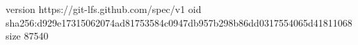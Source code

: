 version https://git-lfs.github.com/spec/v1
oid sha256:d929e17315062074ad81753584c0947db957b298b86dd0317554065d41811068
size 87540
